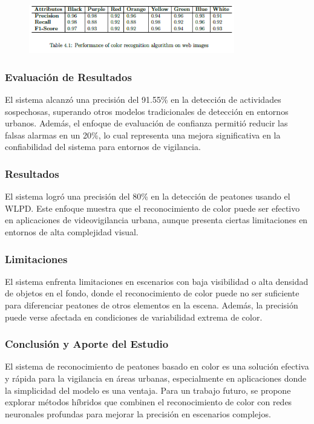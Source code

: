 \documentclass[listof=nochaptergap,12pt,times,authoryear]{report}
\begin{document}
\begin{figure}[h] %
    \centering
    \includegraphics[width=0.8\textwidth]{eva6.png} %
    \label{fig:ejemplo} %
\end{figure}


\subsubsection{Evaluación de Resultados}
El sistema alcanzó una precisión del 91.55\% en la detección de actividades sospechosas, superando otros modelos tradicionales de detección en entornos urbanos. Además, el enfoque de evaluación de confianza permitió reducir las falsas alarmas en un 20\%, lo cual representa una mejora significativa en la confiabilidad del sistema para entornos de vigilancia.

\subsubsection{Resultados}
El sistema logró una precisión del 80\% en la detección de peatones usando el WLPD. Este enfoque muestra que el reconocimiento de color puede ser efectivo en aplicaciones de videovigilancia urbana, aunque presenta ciertas limitaciones en entornos de alta complejidad visual.

\subsubsection{Limitaciones}
El sistema enfrenta limitaciones en escenarios con baja visibilidad o alta densidad de objetos en el fondo, donde el reconocimiento de color puede no ser suficiente para diferenciar peatones de otros elementos en la escena. Además, la precisión puede verse afectada en condiciones de variabilidad extrema de color.

\subsubsection{Conclusión y Aporte del Estudio}
El sistema de reconocimiento de peatones basado en color es una solución efectiva y rápida para la vigilancia en áreas urbanas, especialmente en aplicaciones donde la simplicidad del modelo es una ventaja. Para un trabajo futuro, se propone explorar métodos híbridos que combinen el reconocimiento de color con redes neuronales profundas para mejorar la precisión en escenarios complejos.
\end{document}
